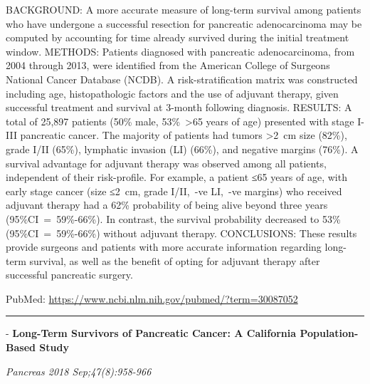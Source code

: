 \documentclass[]{article}
\begin{document}
BACKGROUND: A more accurate measure of long-term survival among patients
who have undergone a successful resection for pancreatic adenocarcinoma
may be computed by accounting for time already survived during the
initial treatment window. METHODS: Patients diagnosed with pancreatic
adenocarcinoma, from 2004 through 2013, were identified from the
American College of Surgeons National Cancer Database (NCDB). A
risk-stratification matrix was constructed including age,
histopathologic factors and the use of adjuvant therapy, given
successful treatment and survival at 3-month following diagnosis.
RESULTS: A total of 25,897 patients (50\% male, 53\%~\textgreater{}65
years of age) presented with stage I-III pancreatic cancer. The majority
of patients had tumors \textgreater{}2~cm size (82\%), grade I/II
(65\%), lymphatic invasion (LI) (66\%), and negative margins (76\%). A
survival advantage for adjuvant therapy was observed among all patients,
independent of their risk-profile. For example, a patient ≤65 years of
age, with early stage cancer (size ≤2~cm, grade I/II,~-ve LI,~-ve
margins) who received adjuvant therapy had a 62\% probability of being
alive beyond three years (95\%CI~=~59\%-66\%). In contrast, the survival
probability decreased to 53\% (95\%CI~=~59\%-66\%) without adjuvant
therapy. CONCLUSIONS: These results provide surgeons and patients with
more accurate information regarding long-term survival, as well as the
benefit of opting for adjuvant therapy after successful pancreatic
surgery.

PubMed: \url{https://www.ncbi.nlm.nih.gov/pubmed/?term=30087052}

{}

{}

\begin{center}\rule{0.5\linewidth}{\linethickness}\end{center}

 - \textbf{Long-Term Survivors of Pancreatic Cancer: A California
Population-Based Study}

\emph{Pancreas 2018 Sep;47(8):958-966}
\end{document}
